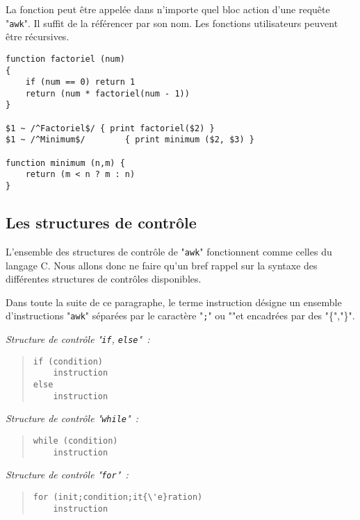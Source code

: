 La fonction peut {\^e}tre appel{\'e}e dans n'importe quel bloc action d'une
requ{\^e}te "\texttt{awk}". Il suffit de la r{\'e}f{\'e}rencer par son nom. Les
fonctions utilisateurs peuvent {\^e}tre r{\'e}cursives.

\begin{example}
\begin{verbatim}
function factoriel (num)
{
    if (num == 0) return 1
    return (num * factoriel(num - 1))
}

$1 ~ /^Factoriel$/ { print factoriel($2) }
$1 ~ /^Minimum$/        { print minimum ($2, $3) }

function minimum (n,m) {
    return (m < n ? m : n)
}
\end{verbatim}
\end{example}

\subsection{Les structures de contr{\^o}le}

L'ensemble des structures de contr{\^o}le de "\texttt{awk}" fonctionnent
comme celles du langage C. Nous allons donc ne faire qu'un bref rappel
sur la syntaxe des diff{\'e}rentes structures de contr{\^o}les disponibles.

Dans toute la suite de ce paragraphe, le terme instruction d{\'e}signe un
ensemble d'instructions "\texttt{awk}" s{\'e}par{\'e}es par le caract{\`e}re
"\texttt{;}" ou "\returnkey"et encadr{\'e}es par des "\{","\}".

\textsl{Structure de contr{\^o}le "\texttt{if}, \texttt{else}"~:}
\begin{quote}
\begin{verbatim}
if (condition)
    instruction
else
    instruction
\end{verbatim}
\end{quote}

\textsl{Structure de contr{\^o}le "\texttt{while}"~:}
\begin{quote}
\begin{verbatim}
while (condition)
    instruction
\end{verbatim}
\end{quote}

\textsl{Structure de contr{\^o}le "\texttt{for}"~:}
\begin{quote}
\begin{verbatim}
for (init;condition;it{\'e}ration)
    instruction
\end{verbatim}
\end{quote}

